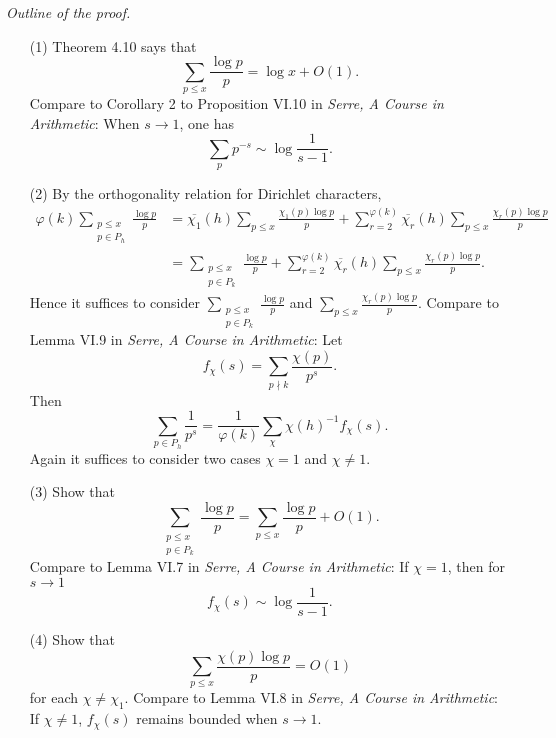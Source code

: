 \documentclass{article}
\begin{document}
\emph{Outline of the proof.}
\begin{enumerate}
\item[(1)]
  Theorem 4.10 says that
  \[
    \sum_{p \leq x} \frac{\log p}{p}
    = \log x + O(1).
  \]
  Compare to Corollary 2 to Proposition VI.10 in \emph{Serre, A Course in Arithmetic}:
  When $s \to 1$, one has
  \[
    \sum_{p} p^{-s} \sim \log \frac{1}{s-1}.
  \]

\item[(2)]
  By the orthogonality relation for Dirichlet characters,
  \begin{align*}
    \varphi(k) \sum_{\substack{p \leq x \\ p \in P_h}} \frac{\log p}{p}
    &= \overline{\chi_1}(h) \sum_{p \leq x} \frac{\chi_1(p) \log p}{p} 
        + \sum_{r=2}^{\varphi(k)} \overline{\chi_r}(h)\sum_{p \leq x} \frac{\chi_r(p) \log p}{p} \\
    &= \sum_{\substack{p \leq x \\ p \in P_k}} \frac{\log p}{p}
        + \sum_{r=2}^{\varphi(k)} \overline{\chi_r}(h)\sum_{p \leq x} \frac{\chi_r(p) \log p}{p}.
  \end{align*}
  Hence it suffices to consider $\sum_{\substack{p \leq x \\ p \in P_k}} \frac{\log p}{p}$
  and $\sum_{p \leq x} \frac{\chi_r(p) \log p}{p}$.
  Compare to Lemma VI.9 in \emph{Serre, A Course in Arithmetic}:
  Let
  \[
    f_{\chi}(s) = \sum_{p \nmid k} \frac{\chi(p)}{p^s}.
  \]
  Then
  \[
    \sum_{p \in P_h} \frac{1}{p^s}
    = \frac{1}{\varphi(k)} \sum_{\chi} \chi(h)^{-1} f_{\chi}(s).
  \]
  Again it suffices to consider two cases $\chi = 1$ and $\chi \neq 1$.

\item[(3)]
  Show that
  \[
    \sum_{\substack{p \leq x \\ p \in P_k}} \frac{\log p}{p}
    = \sum_{p \leq x} \frac{\log p}{p} + O(1).
  \]
  Compare to Lemma VI.7 in \emph{Serre, A Course in Arithmetic}:
  If $\chi = 1$, then for $s \to 1$
  \[
    f_{\chi}(s) \sim \log \frac{1}{s - 1}.
  \]

\item[(4)]
  Show that
  \[
    \sum_{p \leq x} \frac{\chi(p) \log p}{p} = O(1)
  \]
  for each $\chi \neq \chi_1$.
  Compare to Lemma VI.8 in \emph{Serre, A Course in Arithmetic}:
  If $\chi \neq 1$, $f_{\chi}(s)$ remains bounded when $s \to 1$.


\end{enumerate}
\end{document}
